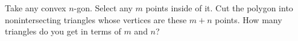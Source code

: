 Take any convex $n$-gon. Select any $m$ points inside of it. Cut the polygon into nonintersecting triangles whose vertices are these $m + n$ points. How many triangles do you get in terms of $m$ and $n$?
